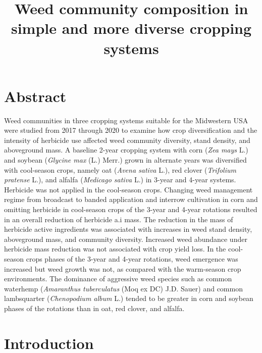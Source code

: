 \documentclass[
]{article}
\title{Weed community composition in simple and more diverse cropping systems}
\author{}
\date{\vspace{-2.5em}}
\begin{document}
\maketitle

\hypertarget{abstract}{%
\section*{Abstract}\label{abstract}}

Weed communities in three cropping systems suitable for the Midwestern USA were studied from 2017 through 2020 to examine how crop diversification and the intensity of herbicide use affected weed community diversity, stand density, and aboveground mass. A baseline 2-year cropping system with corn (\emph{Zea mays} L.) and soybean (\emph{Glycine max} (L.) Merr.) grown in alternate years was diversified with cool-season crops, namely oat (\emph{Avena sativa} L.), red clover (\emph{Trifolium pratense} L.), and alfalfa (\emph{Medicago sativa} L.) in 3-year and 4-year systems. Herbicide was not applied in the cool-season crops. Changing weed management regime from broadcast to banded application and interrow cultivation in corn and omitting herbicide in cool-season crops of the 3-year and 4-year rotations resulted in an overall reduction of herbicide a.i mass. The reduction in the mass of herbicide active ingredients was associated with increases in weed stand density, aboveground mass, and community diversity. Increased weed abundance under herbicide mass reduction was not associated with crop yield loss. In the cool-season crops phases of the 3-year and 4-year rotations, weed emergence was increased but weed growth was not, as compared with the warm-season crop environments. The dominance of aggressive weed species such as common waterhemp (\emph{Amaranthus tuberculatus} (Moq ex DC) J.D. Sauer) and common lambsquarter (\emph{Chenopodium album} L.) tended to be greater in corn and soybean phases of the rotations than in oat, red clover, and alfalfa.

\hypertarget{introduction}{%
\section*{Introduction}\label{introduction}}
\end{document}
